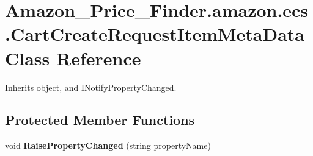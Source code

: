 \hypertarget{class_amazon___price___finder_1_1amazon_1_1ecs_1_1_cart_create_request_item_meta_data}{\section{Amazon\-\_\-\-Price\-\_\-\-Finder.\-amazon.\-ecs.\-Cart\-Create\-Request\-Item\-Meta\-Data Class Reference}
\label{class_amazon___price___finder_1_1amazon_1_1ecs_1_1_cart_create_request_item_meta_data}
}


 




Inherits object, and I\-Notify\-Property\-Changed.

\subsection*{Protected Member Functions}
\begin{DoxyCompactItemize}
\item 
\hypertarget{class_amazon___price___finder_1_1amazon_1_1ecs_1_1_cart_create_request_item_meta_data_a943a88c038341f56035cf859facb1c7a}{void {\bfseries Raise\-Property\-Changed} (string property\-Name)}\label{class_amazon___price___finder_1_1amazon_1_1ecs_1_1_cart_create_request_item_meta_data_a943a88c038341f56035cf859facb1c7a}

\end{DoxyCompactItemize}
